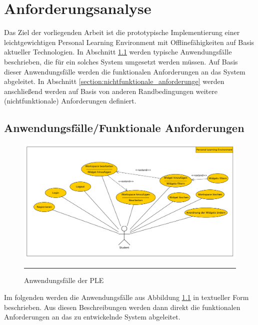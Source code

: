 \chapter{Anforderungsanalyse} 
\label{chapter:Kapitel3}

Das Ziel der vorliegenden Arbeit ist die prototypische Implementierung einer leichtgewichtigen Personal Learning Environment mit Offlinefähigkeiten auf Basis aktueller Technologien. In Abschnitt \ref{section:anwendungsfaelle} werden typische Anwendungsfälle beschrieben, die für ein solches System umgesetzt werden müssen. Auf Basis dieser Anwendungsfälle werden die funktionalen Anforderungen an das System abgeleitet. In Abschnitt \ref{section:nichtfunktionale_anforderunge} werden anschließend werden auf Basis von anderen Randbedingungen weitere (nichtfunktionale) Anforderungen definiert.

\section{Anwendungsfälle/Funktionale Anforderungen}\label{section:anwendungsfaelle}
\begin{figure}[h]
  \centering
  \includegraphics[width=\textwidth,height=\textheight,keepaspectratio]{./Figures/anwendungsfaelle_quer.pdf}
    \rule{35em}{0.5pt}
  \caption[Die wichtigsten Anwendungsfälle für die prototypische Personal Learning EnvironmentAnwendungsfälle der PLE]{Anwendungsfälle der PLE}
  \label{fig:anwendungsfaelle}
\end{figure}

Im folgenden werden die Anwendungsfälle aus Abbildung \ref{fig:anwendungsfaelle} in textueller Form beschrieben. Aus diesen Beschreibungen werden dann direkt die funktionalen Anforderungen an das zu entwickelnde System abgeleitet.


